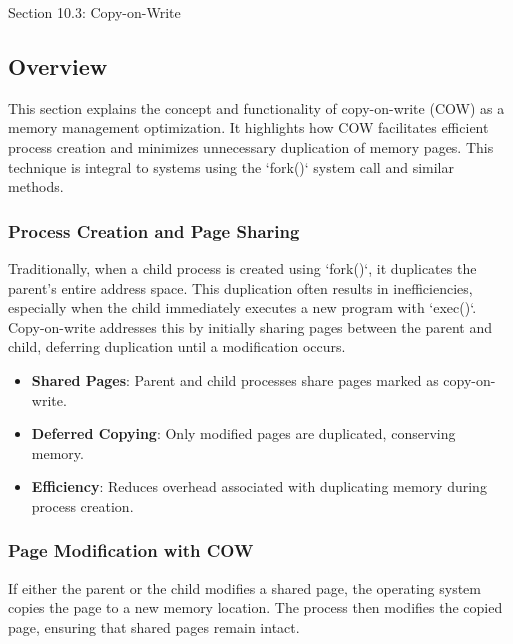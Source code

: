 \begin{notes}{Section 10.3: Copy-on-Write}
    \subsection*{Overview}

    This section explains the concept and functionality of copy-on-write (COW) as a memory management optimization. It highlights how COW facilitates efficient process creation and minimizes 
    unnecessary duplication of memory pages. This technique is integral to systems using the `fork()` system call and similar methods.
    
    \subsubsection*{Process Creation and Page Sharing}
    
    Traditionally, when a child process is created using `fork()`, it duplicates the parent's entire address space. This duplication often results in inefficiencies, especially when the child 
    immediately executes a new program with `exec()`. Copy-on-write addresses this by initially sharing pages between the parent and child, deferring duplication until a modification occurs.
    
    \begin{highlight}
    
    \begin{itemize}
        \item \textbf{Shared Pages}: Parent and child processes share pages marked as copy-on-write.
        \item \textbf{Deferred Copying}: Only modified pages are duplicated, conserving memory.
        \item \textbf{Efficiency}: Reduces overhead associated with duplicating memory during process creation.
    \end{itemize}
    
    \end{highlight}
    
    \subsubsection*{Page Modification with COW}
    
    If either the parent or the child modifies a shared page, the operating system copies the page to a new memory location. The process then modifies the copied page, ensuring that shared pages remain intact.
    

\end{notes}
